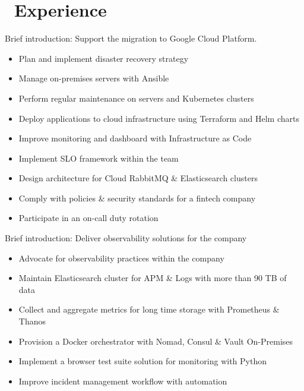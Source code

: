 \documentclass{resume}
\begin{document}
\begin{minipage}[t]{0.67\textwidth}

\section{\texorpdfstring{\textbf{}\ Experience}{Experience}}

Brief introduction: Support the migration to Google Cloud Platform.
\begin{itemize}
  \item Plan and implement disaster recovery strategy
  \item Manage on-premises servers with Ansible
  \item Perform regular maintenance on servers and Kubernetes clusters
  \item Deploy applications to cloud infrastructure using Terraform and Helm charts
  \item Improve monitoring and dashboard with Infrastructure as Code
  \item Implement SLO framework within the team
  \item Design architecture for Cloud RabbitMQ \& Elasticsearch clusters
  \item Comply with policies \& security standards for a fintech company
  \item Participate in an on-call duty rotation
\end{itemize}

Brief introduction: Deliver observability solutions for the company
\begin{itemize}
  \item Advocate for observability practices within the company
  \item Maintain Elasticsearch cluster for APM \& Logs with more than 90 TB of data
  \item Collect and aggregate metrics for long time storage with Prometheus \& Thanos
  \item Provision a Docker orchestrator with Nomad, Consul \& Vault On-Premises
  \item Implement a browser test suite solution for monitoring with Python
  \item Improve incident management workflow with automation
\end{itemize}


\end{minipage}
\end{document}
